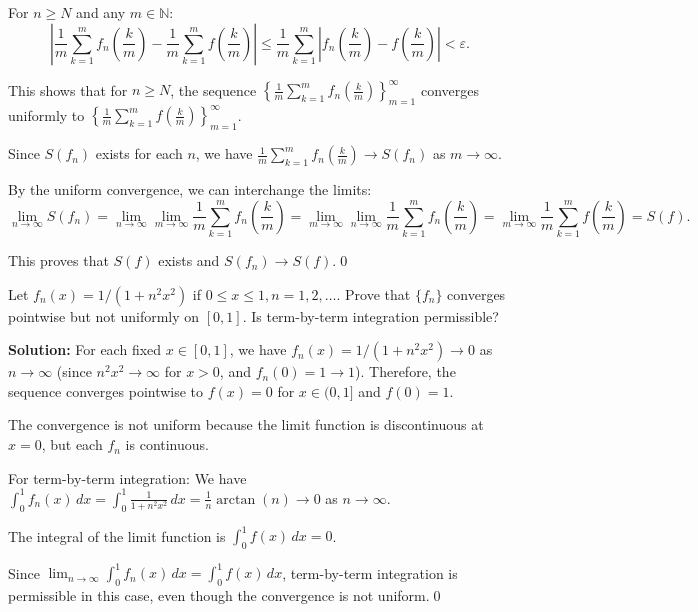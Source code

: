For \( n \geq N \) and any \( m \in \mathbb{N} \):
\[\left|\frac{1}{m} \sum_{k=1}^m f_n \left( \frac{k}{m} \right) - \frac{1}{m} \sum_{k=1}^m f \left( \frac{k}{m} \right)\right| \leq \frac{1}{m} \sum_{k=1}^m \left|f_n \left( \frac{k}{m} \right) - f \left( \frac{k}{m} \right)\right| < \varepsilon.\]

This shows that for \( n \geq N \), the sequence \( \left\{\frac{1}{m} \sum_{k=1}^m f_n \left( \frac{k}{m} \right)\right\}_{m=1}^{\infty} \) converges uniformly to \( \left\{\frac{1}{m} \sum_{k=1}^m f \left( \frac{k}{m} \right)\right\}_{m=1}^{\infty} \).

Since \( S(f_n) \) exists for each \( n \), we have \( \frac{1}{m} \sum_{k=1}^m f_n \left( \frac{k}{m} \right) \to S(f_n) \) as \( m \to \infty \).

By the uniform convergence, we can interchange the limits:
\[\lim_{n \to \infty} S(f_n) = \lim_{n \to \infty} \lim_{m \to \infty} \frac{1}{m} \sum_{k=1}^m f_n \left( \frac{k}{m} \right) = \lim_{m \to \infty} \lim_{n \to \infty} \frac{1}{m} \sum_{k=1}^m f_n \left( \frac{k}{m} \right) = \lim_{m \to \infty} \frac{1}{m} \sum_{k=1}^m f \left( \frac{k}{m} \right) = S(f).\]

This proves that \( S(f) \) exists and \( S(f_n) \to S(f) \).\qed


\begin{problembox}
Let \( f_n(x) = 1/(1 + n^2x^2) \) if \( 0 \leq x \leq 1, n = 1, 2, \ldots \). Prove that \(\{f_n\}\) converges pointwise but not uniformly on \([0, 1]\). Is term-by-term integration permissible?
\end{problembox}

\noindent\textbf{Solution:} For each fixed \( x \in [0, 1] \), we have \( f_n(x) = 1/(1 + n^2x^2) \to 0 \) as \( n \to \infty \) (since \( n^2x^2 \to \infty \) for \( x > 0 \), and \( f_n(0) = 1 \to 1 \)). Therefore, the sequence converges pointwise to \( f(x) = 0 \) for \( x \in (0, 1] \) and \( f(0) = 1 \).

The convergence is not uniform because the limit function is discontinuous at \( x = 0 \), but each \( f_n \) is continuous.

For term-by-term integration: We have \( \int_0^1 f_n(x) \, dx = \int_0^1 \frac{1}{1 + n^2x^2} \, dx = \frac{1}{n} \arctan(n) \to 0 \) as \( n \to \infty \).

The integral of the limit function is \( \int_0^1 f(x) \, dx = 0 \).

Since \( \lim_{n \to \infty} \int_0^1 f_n(x) \, dx = \int_0^1 f(x) \, dx \), term-by-term integration is permissible in this case, even though the convergence is not uniform.\qed



